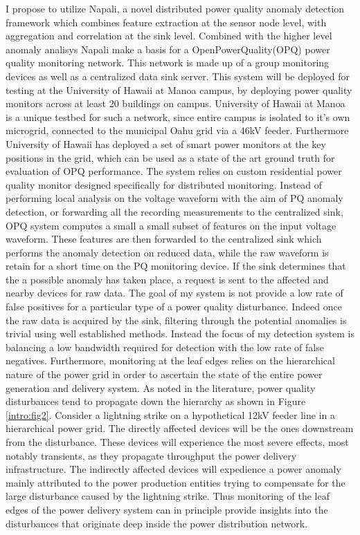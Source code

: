 I propose to utilize Napali, a novel distributed power quality anomaly detection framework which combines feature extraction at the sensor node level, with aggregation and correlation at the sink level. Combined with the higher level anomaly analisys Napali make a basis for a OpenPowerQuality(OPQ) power quality monitoring network. This network is made up of a group  monitoring devices as well as a centralized data sink server. This system will be deployed for testing at the University of Hawaii at Manoa campus, by deploying power quality monitors across at least 20 buildings on campus. University of Hawaii at Manoa is a unique testbed for such a network, since entire campus is isolated to it's own microgrid, connected to the municipal Oahu grid via a 46kV feeder. Furthermore University of Hawaii has deployed a set of smart power monitors at the key positions in the grid, which can be used as a state of the art ground truth for evaluation of OPQ performance. The system relies on custom residential power quality monitor designed specifically for distributed monitoring. Instead of performing local analysis on the voltage waveform with the aim of PQ anomaly detection, or forwarding all the recording measurements to the centralized sink, OPQ system computes a small a small subset of features on the input voltage waveform. These features are then forwarded to the centralized sink which performs the anomaly detection on reduced data, while the raw waveform is retain for a short time on the PQ monitoring device. If the sink determines that the a possible anomaly has taken place, a request is sent to the affected and nearby devices for raw data. The goal of my system is not provide a low rate of false positives for a particular type of a power quality disturbance. Indeed once the raw data is acquired by the sink, filtering through the potential anomalies is trivial using well established methods. Instead the focus of my detection system is balancing a low bandwidth required for detection with the low rate of false negatives. Furthermore, monitoring at the leaf edges relies on the hierarchical nature of the power grid in order to ascertain the state of the entire power generation and delivery system. As noted in the literature, power quality disturbances tend to propagate down the hierarchy as shown in Figure \ref{intro:fig2}. Consider a lightning strike on a hypothetical 12kV feeder line in a hierarchical power grid. The directly affected devices will be the ones downstream from the disturbance. These devices will experience the most severe effects, most notably transients, as they propagate throughput the power delivery infrastructure. The indirectly affected devices will expedience a power anomaly mainly attributed to the power production entities trying to compensate for the large disturbance caused by the lightning strike. Thus monitoring of the leaf edges of the power delivery system can in principle provide insights into the disturbances that originate deep inside the power distribution network.

